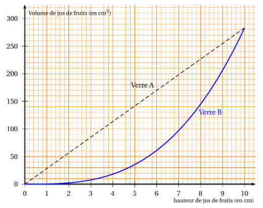 \documentclass[14 pt, fleqn, pstricks]{extarticle}
\theoremstyle{plain}
\begin{document}
\includegraphics[scale=3]{Exo3.png}












    

 	
\end{document}
